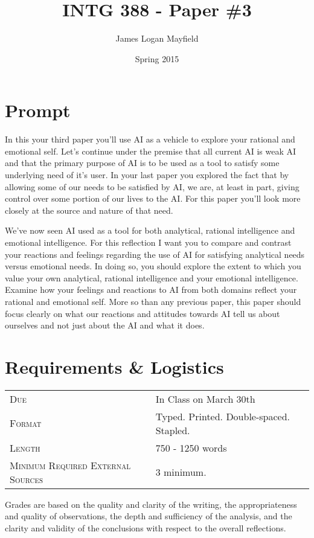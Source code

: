 \documentclass[nobib]{tufte-handout}
\title{INTG 388 - Paper \#3 }
\author{James Logan Mayfield}
\date{ Spring 2015 }
\begin{document}
\maketitle

\section{Prompt}


In this your third paper you'll use AI as a vehicle to explore your rational and emotional self.  Let's continue under the premise that all current AI is weak AI and that the primary purpose of AI is to be used as a tool to satisfy some underlying need of it's user. In your last paper you explored the fact that by allowing some of our needs to be satisfied by AI, we are, at least in part, giving control over some portion of our lives to the AI.  For this paper you'll look more closely at the source and nature of that need. 

We've now seen AI used as a tool for both analytical, rational intelligence and emotional intelligence. For this reflection I want you to compare and contrast your reactions and feelings regarding the use of AI for satisfying analytical needs versus emotional needs.  In doing so, you should explore the extent to which you value your own analytical, rational intelligence and your emotional intelligence. Examine how your feelings and reactions to AI from both domains reflect your rational and emotional self. More so than any previous paper, this paper should focus clearly on what our reactions and attitudes towards AI tell us about ourselves and not just about the AI and what it does. 

\section{Requirements \& Logistics}

\begin{tabular}{ll}
\textsc{Due} & In Class on March 30th  \\
\textsc{Format} & Typed. Printed. Double-spaced. Stapled. \\
\textsc{Length} & 750 - 1250 words \\
\textsc{Minimum Required External Sources} & 3 minimum.  
\end{tabular}

\vspace{.1in}
Grades are based on the quality and clarity of the writing, the appropriateness and quality of observations, the depth and sufficiency of the analysis, and the clarity and validity of the conclusions with respect to the overall reflections.  
\end{document}
